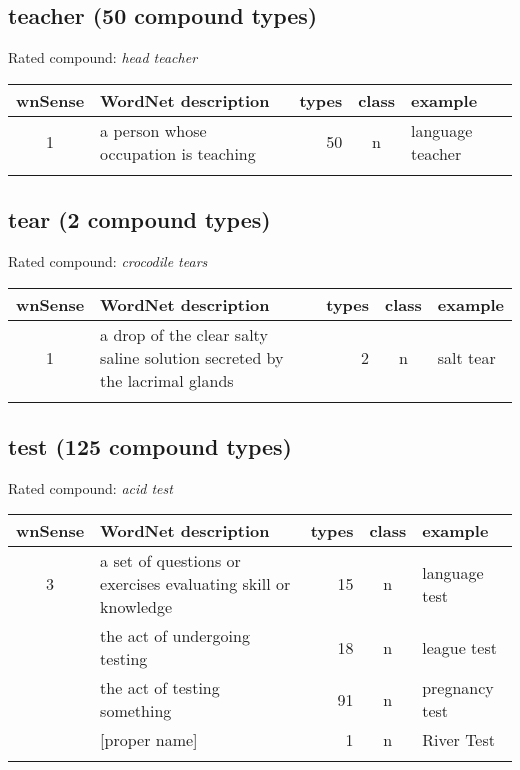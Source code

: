 \subsection{teacher   (50 compound types)}
Rated compound: \emph{head teacher}

\vspace*{1ex}

\noindent
\begin{longtable}{c>{\raggedright\arraybackslash}p{5cm}rc>{\raggedright\arraybackslash}p{2cm}}\lsptoprule
{\small wnSense}&WordNet description&types&class&example\\\midrule
1&a person whose occupation is teaching&50&n&language teacher\\\lspbottomrule
\end{longtable}
\subsection{tear      (2 compound types)}
Rated compound: \emph{crocodile tears}

\vspace*{1ex}

\noindent
\begin{longtable}{c>{\raggedright\arraybackslash}p{5cm}rc>{\raggedright\arraybackslash}p{2cm}}\lsptoprule
{\small wnSense}&WordNet description&types&class&example\\\midrule
1&a drop of the clear salty saline solution secreted by the lacrimal glands&2&n&salt tear\\\lspbottomrule
\end{longtable}
\subsection{test     (125 compound types)}
Rated compound: \emph{acid test}

\vspace*{1ex}

\noindent
\begin{longtable}{c>{\raggedright\arraybackslash}p{5cm}rc>{\raggedright\arraybackslash}p{2cm}}\lsptoprule
{\small wnSense}&WordNet description&types&class&example\\\midrule
3&a set of questions or exercises evaluating skill or knowledge&15&n&language test\\\tablevspace
4&the act of undergoing testing&18&n&league test\\\tablevspace
5&the act of testing something&91&n&pregnancy test\\\tablevspace
7&{}[proper name]&1&n&River Test\\\lspbottomrule
\end{longtable}


